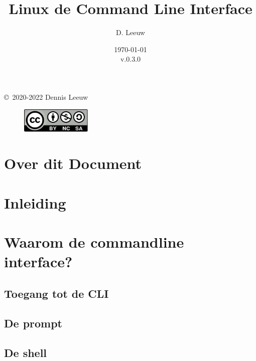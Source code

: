 \documentclass[a4paper,12pt,twoside,openright,titlepage]{book}
\author{D. Leeuw}
\title{Linux de Command Line Interface}
\date{\today\\v.0.3.0}
\begin{document}

\maketitle

\copyright\ 2020-2022 Dennis Leeuw\\

\begin{figure}
\includegraphics[width=0.3\textwidth]{CC-BY-SA-NC.png}
\end{figure}

\bigskip




\frontmatter
\chapter{Over dit Document}



\tableofcontents

\mainmatter
\chapter{Inleiding}


\chapter{Waarom de commandline interface?}

\section{Toegang tot de CLI}

\section{De prompt}

\section{De shell}

\end{document}
